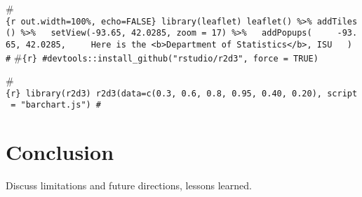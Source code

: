 \documentclass[]{book}
\begin{document}
\#\texttt{\{r\ out.width=\textquotesingle{}100\%\textquotesingle{},\ echo=FALSE\}\ library(leaflet)\ leaflet()\ \%\textgreater{}\%\ addTiles()\ \%\textgreater{}\%\ \ \ setView(-93.65,\ 42.0285,\ zoom\ =\ 17)\ \%\textgreater{}\%\ \ \ addPopups(\ \ \ \ \ -93.65,\ 42.0285,\ \ \ \ \ \textquotesingle{}Here\ is\ the\ \textless{}b\textgreater{}Department\ of\ Statistics\textless{}/b\textgreater{},\ ISU\textquotesingle{}\ \ \ )\ \#}
\#\texttt{\{r\}\ \#devtools::install\_github("rstudio/r2d3",\ force\ =\ TRUE)}

\#\texttt{\{r\}\ library(r2d3)\ r2d3(data=c(0.3,\ 0.6,\ 0.8,\ 0.95,\ 0.40,\ 0.20),\ script\ =\ "barchart.js")\ \#}

\hypertarget{conclusion}{%
\chapter{Conclusion}\label{conclusion}}

Discuss limitations and future directions, lessons learned.


\end{document}
